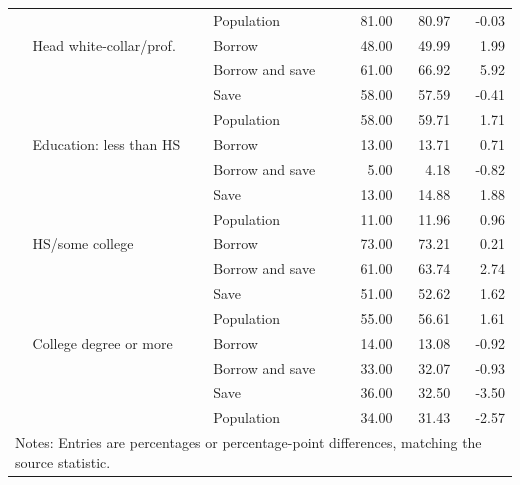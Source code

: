 \begin{longtable}{lllrrr}
 &  & Population & 81.00 & 80.97 & -0.03 \\
 & Head white-collar/prof. & Borrow & 48.00 & 49.99 & 1.99 \\
 &  & Borrow and save & 61.00 & 66.92 & 5.92 \\
 &  & Save & 58.00 & 57.59 & -0.41 \\
 &  & Population & 58.00 & 59.71 & 1.71 \\
 & Education: less than HS & Borrow & 13.00 & 13.71 & 0.71 \\
 &  & Borrow and save & 5.00 & 4.18 & -0.82 \\
 &  & Save & 13.00 & 14.88 & 1.88 \\
 &  & Population & 11.00 & 11.96 & 0.96 \\
 & HS/some college & Borrow & 73.00 & 73.21 & 0.21 \\
 &  & Borrow and save & 61.00 & 63.74 & 2.74 \\
 &  & Save & 51.00 & 52.62 & 1.62 \\
 &  & Population & 55.00 & 56.61 & 1.61 \\
 & College degree or more & Borrow & 14.00 & 13.08 & -0.92 \\
 &  & Borrow and save & 33.00 & 32.07 & -0.93 \\
 &  & Save & 36.00 & 32.50 & -3.50 \\
 &  & Population & 34.00 & 31.43 & -2.57 \\
\bottomrule
\multicolumn{6}{l}{\footnotesize Notes: Entries are percentages or percentage-point differences, matching the source statistic.}\\
\end{longtable}
